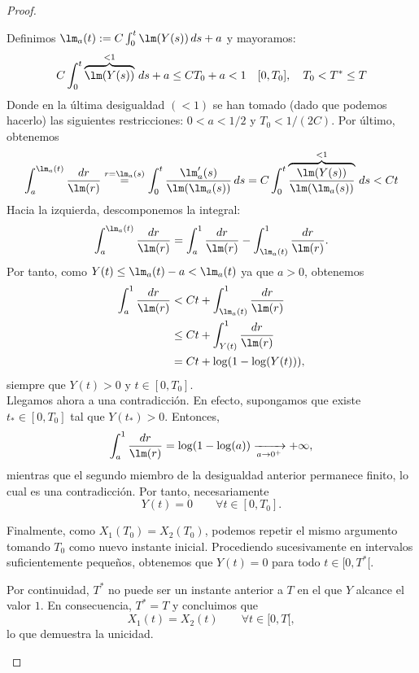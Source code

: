 \begin{proof}
\begin{itemize}
        Definimos $\lm_a(t) := C \int_{0}^{t} \lm(Y(s))\,ds + a$ y mayoramos:
        $$C \int_{0}^{t} \overbrace{\lm(Y(s))}^{<1}\,ds + a \leq C T_0 + a < 1 \quad [0,T_0], \quad T_0 < T^{*} \leq T$$
        Donde en la última desigualdad $(<1)$ se han tomado (dado que podemos hacerlo) las siguientes restricciones: $0 < a < 1/2$ y $T_0 < 1/(2C)$.
        Por último, obtenemos 
        $$\int_{a}^{\lm_a(t)} \dfrac{dr}{\lm(r)} \stackrel{r = \lm_a(s)}{=} \int_{0}^{t} \dfrac{\lm_a'(s)}{\lm(\lm_a(s))}\,ds = 
        C\int_{0}^{t} \overbrace{\dfrac{\lm(Y(s))}{\lm(\lm_a(s))}}^{<1}\,ds < Ct$$
        Hacia la izquierda, descomponemos la integral:
        $$
        \int_a^{\lm_a(t)}\frac{dr}{\lm(r)}
        =
        \int_a^1\frac{dr}{\lm(r)}
        -
        \int_{\lm_a(t)}^1\frac{dr}{\lm(r)}.
        $$
        Por tanto, como $Y(t)\leq \lm_a(t) - a <\lm_a(t)$ ya que $a > 0$, obtenemos
        $$
        \begin{aligned}
        \int_a^1\frac{dr}{\lm(r)}
        &<Ct+\int_{\lm_a(t)}^1\frac{dr}{\lm(r)}\\
        &\leq Ct+\int_{Y(t)}^1\frac{dr}{\lm(r)}\\
        &=Ct+\log(1-\log(Y(t))),
        \end{aligned}
        $$
        siempre que $Y(t)>0$ y $t\in[0,T_0]$. \\

        Llegamos ahora a una contradicción. En efecto,
        supongamos que existe $t_*\in[0,T_0]$ tal que
        $Y(t_*)>0$. Entonces,
        \[
        \int_a^1\frac{dr}{\lm(r)}
        =\log(1-\log(a))
        \xrightarrow[a\to0^+]{}+\infty,
        \]
        mientras que el segundo miembro de la desigualdad
        anterior permanece finito, lo cual es una contradicción.
        Por tanto, necesariamente
        \[
        Y(t)=0\qquad\forall t\in[0,T_0].
        \]

        Finalmente, como $X_1(T_0)=X_2(T_0)$, podemos
        repetir el mismo argumento tomando $T_0$ como
        nuevo instante inicial. Procediendo sucesivamente
        en intervalos suficientemente pequeños, obtenemos
        que $Y(t)=0$ para todo $t\in[0,T^*[$.

        Por continuidad, $T^*$ no puede ser un instante
        anterior a $T$ en el que $Y$ alcance el valor $1$.
        En consecuencia, $T^*=T$ y concluimos que
        \[
        X_1(t)=X_2(t)\qquad\forall t\in[0,T[,
        \]
        lo que demuestra la unicidad. \qedhere
    \end{itemize}
\end{proof}


